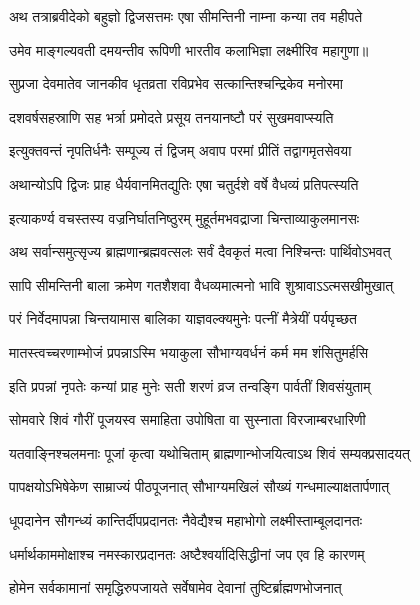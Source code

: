 \twolineshloka
{अथ तत्राब्रवीदेको बहुज्ञो द्विजसत्तमः}
{एषा सीमन्तिनी नाम्ना कन्या तव महीपते} %

\twolineshloka
{उमेव माङ्गल्यवती दमयन्तीव रूपिणी}
{भारतीव कलाभिज्ञा लक्ष्मीरिव महागुणा॥} %

\twolineshloka
{सुप्रजा देवमातेव जानकीव धृतव्रता}
{रविप्रभेव सत्कान्तिश्चन्द्रिकेव मनोरमा} %

\twolineshloka
{दशवर्षसहस्राणि सह भर्त्रा प्रमोदते}
{प्रसूय तनयानष्टौ परं सुखमवाप्स्यति} %

\twolineshloka
{इत्युक्तवन्तं नृपतिर्धनैः सम्पूज्य तं द्विजम्}
{अवाप परमां प्रीतिं तद्वागमृतसेवया} %

\twolineshloka
{अथान्योऽपि द्विजः प्राह धैर्यवानमितद्युतिः}
{एषा चतुर्दशे वर्षे वैधव्यं प्रतिपत्स्यति} %

\twolineshloka
{इत्याकर्ण्य वचस्तस्य वज्रनिर्घातनिष्ठुरम्}
{मुहूर्तमभवद्राजा चिन्ताव्याकुलमानसः} %

\twolineshloka
{अथ सर्वान्समुत्सृज्य ब्राह्मणान्ब्रह्मवत्सलः}
{सर्वं दैवकृतं मत्वा निश्चिन्तः पार्थिवोऽभवत्} %

\twolineshloka
{सापि सीमन्तिनी बाला क्रमेण गतशैशवा}
{वैधव्यमात्मनो भावि शुश्रावाऽऽत्मसखीमुखात्} %

\twolineshloka
{परं निर्वेदमापन्ना चिन्तयामास बालिका}
{याज्ञवल्क्यमुनेः पत्नीं मैत्रेयीं पर्यपृच्छत} %

\twolineshloka
{मातस्त्वच्चरणाम्भोजं प्रपन्नाऽस्मि भयाकुला}
{सौभाग्यवर्धनं कर्म मम शंसितुमर्हसि} %

\twolineshloka
{इति प्रपन्नां नृपतेः कन्यां प्राह मुनेः सती}
{शरणं व्रज तन्वङ्गि पार्वतीं शिवसंयुताम्} %

\twolineshloka
{सोमवारे शिवं गौरीं पूजयस्व समाहिता}
{उपोषिता वा सुस्नाता विरजाम्बरधारिणी} %

\twolineshloka
{यतवाङ्निश्चलमनाः पूजां कृत्वा यथोचिताम्}
{ब्राह्मणान्भोजयित्वाऽथ शिवं सम्यक्प्रसादयत्} %

\twolineshloka
{पापक्षयोऽभिषेकेण साम्राज्यं पीठपूजनात्}
{सौभाग्यमखिलं सौख्यं गन्धमाल्याक्षतार्पणात्} %

\twolineshloka
{धूपदानेन सौगन्ध्यं कान्तिर्दीपप्रदानतः}
{नैवेद्यैश्च महाभोगो लक्ष्मीस्ताम्बूलदानतः} %

\twolineshloka
{धर्मार्थकाममोक्षाश्च नमस्कारप्रदानतः}
{अष्टैश्वर्यादिसिद्धीनां जप एव हि कारणम्} %

\twolineshloka
{होमेन सर्वकामानां समृद्धिरुपजायते}
{सर्वेषामेव देवानां तुष्टिर्ब्राह्मणभोजनात्} %

